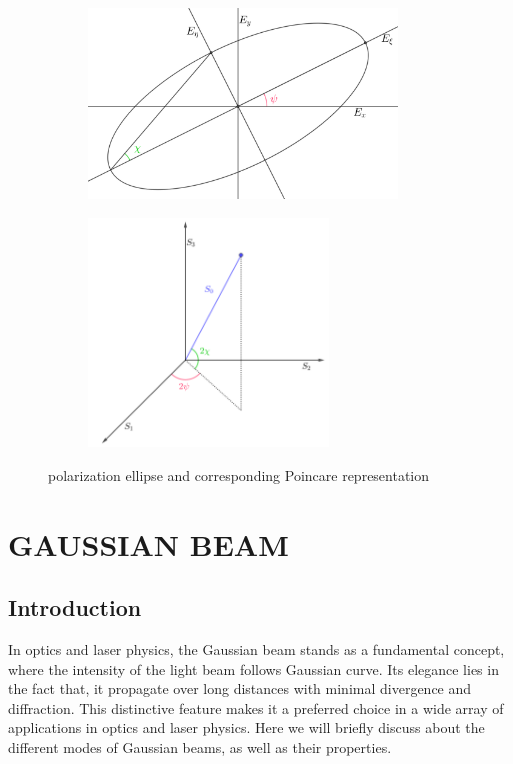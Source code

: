 \documentclass[11pt,a4paper]{article}
\numberwithin{equation}{section}
\begin{document}
\begin{figure}[H]
	\begin{subfigure}[H]{0.48\textwidth}
		\centering
		\includegraphics[width=0.9\textwidth]{ellipse_new}
		\caption{}
	\end{subfigure}
	\hfill
	\begin{subfigure}[H]{0.48\textwidth}
		\centering
		\includegraphics[width=0.7\textwidth]{poincare}
		\caption{}
	\end{subfigure}
	\caption{polarization ellipse and corresponding Poincare representation}
	\label{fig:compare poincare}
\end{figure}

\clearpage



\section{GAUSSIAN BEAM}
\subsection{Introduction}
In optics and laser physics, the Gaussian beam stands as a fundamental concept, where the intensity of the light beam follows Gaussian curve. Its elegance lies in the fact that, it propagate over long distances with minimal divergence and diffraction. This distinctive feature makes it a preferred choice in a wide array of applications in optics and laser physics. Here we will briefly discuss about the different modes of Gaussian beams, as well as their properties.
\end{document}
